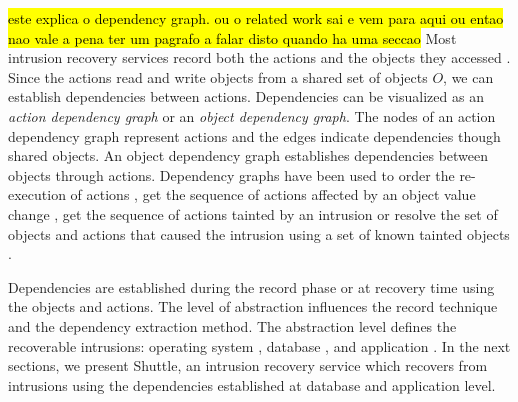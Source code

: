 \hl{este explica o dependency graph. ou o related work sai e vem para aqui ou entao nao vale a pena ter um pagrafo a falar disto quando ha uma seccao}
Most intrusion recovery services record both the actions and  the objects they accessed  \cite{goel,itdb,warp}. Since the actions read and write objects from a shared set of objects $O$, we can establish dependencies between actions. Dependencies can be visualized as an \textit{action dependency graph} or an \textit{object dependency graph}. The nodes of an action dependency graph represent actions and the edges indicate dependencies though shared objects. An object dependency graph establishes dependencies between objects through actions. Dependency graphs have been used to order the re-execution of actions \cite{undoForOperators}, get the sequence of actions affected by an object value change \cite{warp}, get the sequence of actions tainted by an intrusion \cite{goel} or resolve the set of objects and actions that caused the intrusion using a set of known tainted objects \cite{backtracker}. 


Dependencies are established during the record phase or at recovery time using the objects and actions. The level of abstraction influences the record technique and the dependency extraction method. The abstraction level defines the recoverable intrusions: operating system \cite{taser,retro}, database \cite{itdb,phoenix}, and application \cite{goel,warp,aire}. In the next sections, we present Shuttle, an intrusion recovery service which recovers from intrusions using the dependencies established at database and application level.
